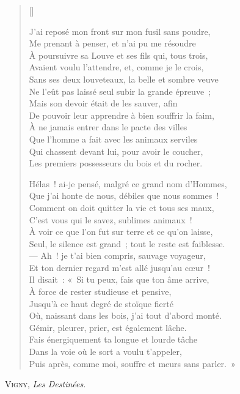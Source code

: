 \documentclass[12pt,a4paper,french]{scrartcl}
\begin{document}
\begin{verse}[\versewidth]
\hspace{0.5\versewidth}{\poemtitlefont\small%
II
}%

J’ai reposé mon front sur mon fusil sans poudre,\\
Me prenant à penser, et n’ai pu me résoudre\\
À poursuivre sa Louve et ses fils qui, tous trois,\\
Avaient voulu l’attendre, et, comme je le crois,\\
Sans ses deux louveteaux, la belle et sombre veuve\\
Ne l’eût pas laissé seul subir la grande épreuve ;\\
Mais son devoir était de les sauver, afin\\
De pouvoir leur apprendre à bien souffrir la faim,\\
À ne jamais entrer dans le pacte des villes\\
Que l’homme a fait avec les animaux serviles\\
Qui chassent devant lui, pour avoir le coucher,\\
Les premiers possesseurs du bois et du rocher.

\hspace{0.5\versewidth}{\poemtitlefont\small%
III
}%

Hélas ! ai-je pensé, malgré ce grand nom d’Hommes,\\
Que j’ai honte de nous, débiles que nous sommes !\\
Comment on doit quitter la vie et tous ses maux,\\
C’est vous qui le savez, sublimes animaux !\\
À voir ce que l’on fut sur terre et ce qu’on laisse,\\
Seul, le silence est grand ; tout le reste est faiblesse.\\
— Ah ! je t’ai bien compris, sauvage voyageur,\\
Et ton dernier regard m’est allé jusqu’au cœur !\\
Il disait : « Si tu peux, fais que ton âme arrive,\\
À force de rester studieuse et pensive,\\
Jusqu’à ce haut degré de stoïque fierté\\
Où, naissant dans les bois, j’ai tout d’abord monté.\\
Gémir, pleurer, prier, est également lâche.\\
Fais énergiquement ta longue et lourde tâche\\
Dans la voie où le sort a voulu t’appeler,\\
Puis après, comme moi, souffre et meurs sans parler. »

\end{verse}

\begin{flushright}
\large
\textsc{Vigny}, \textit{Les Destinées}.
\end{flushright}
\end{document}
